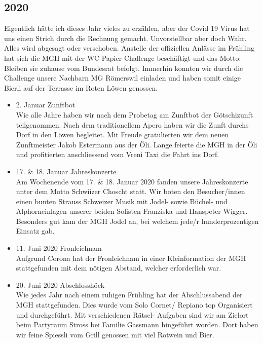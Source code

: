 \subsection*{2020}
\begin{history}

      Eigentlich hätte ich dieses Jahr vieles zu erzählen, aber der Covid 19 Virus
      hat uns einen Strich durch die Rechnung gemacht. Unvorstellbar aber doch
      Wahr. Alles wird abgesagt oder verschoben. Anstelle der offiziellen Anlässe
      im Frühling hat sich die MGH mit der WC-Papier Challenge beschäftigt und das
      Motto: Bleiben sie zuhause vom Bundesrat befolgt. Immerhin konnten wir durch
      die Challenge unsere Nachbarn MG Römerswil einladen und haben somit einige
      Bierli auf der Terrasse im Roten Löwen genossen.

      \begin{itemize}

            \item 2. Januar Zunftbot\\
                  Wie alle Jahre haben wir nach dem Probetag am Zunftbot der Götschizunft teilgenommen.
                  Nach dem traditionellem Apero haben wir die Zunft durchs Dorf in den Löwen begleitet.
                  Mit Freude gratulierten wir dem neuen Zunftmeister Jakob Estermann aus der Öli.
                  Lange feierte die MGH in der Öli und profitierten anschliessend vom Vreni Taxi die Fahrt ins Dorf.

            \item 17. & 18. Januar Jahreskonzerte\\
                  Am Wochenende vom 17. & 18. Januar 2020 fanden unsere Jahreskonzerte unter dem Motto
                  Schwiizer Choscht statt. Wir boten den Besucher/innen einen bunten Strauss Schweizer Musik mit
                  Jodel- sowie Büchel- und Alphorneinlagen unserer beiden Solisten Franziska und Hanspeter Wigger.
                  Besonders gut kam der MGH Jodel an, bei welchem jede/r hunderprozentigen Einsatz gab.

            \item 11. Juni 2020 Fronleichnam\\
                  Aufgrund Corona hat der Fronleichnam in einer Kleinformation der
                  MGH stattgefunden mit dem nötigen Abstand, welcher erforderlich
                  war.

            \item 20. Juni 2020 Abschlosshöck\\
                  Wie jedes Jahr nach einem ruhigen Frühling hat der Abschlussabend
                  der MGH stattgefunden. Dies wurde vom Solo Cornet/ Repiano top
                  Organisiert und durchgeführt. Mit verschiedenen Rätsel- Aufgaben
                  sind wir am Zielort beim Partyraum Stross bei Familie Gassmann
                  hingeführt worden. Dort haben wir feine Spiessli vom Grill
                  genossen mit viel Rotwein und Bier.


\end{itemize}
\end{history}
